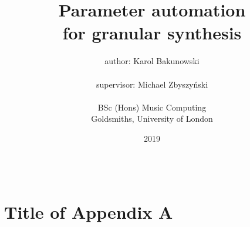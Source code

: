 \documentclass[a4paper]{report}
\begin{document}
\setlength{\TPHorizModule}{200mm} 
\setlength{\TPVertModule}{100mm} 
\textblockorigin{61mm}{19mm}
\setlength \parindent{0em}
\setlength \parskip{1em}


\onehalfspace{}


\providecommand{\OT}[1]{\operatorname{\Theta}\bigl(#1\bigr)}
\providecommand{\OOm}[1]{\operatorname{\Omega}\bigl(#1\bigr)}


\title{Parameter automation \\for granular synthesis}
\author{author: Karol Bakunowski \\
\\
supervisor: Michael Zbyszyński\\
\\
BSc (Hons) Music Computing\\
Goldsmiths, University of London
}

\date{2019}

\maketitle

  





\tableofcontents
\listoffigures
\listoftables















\appendix
\section{\\Title of Appendix A}



\end{document}
